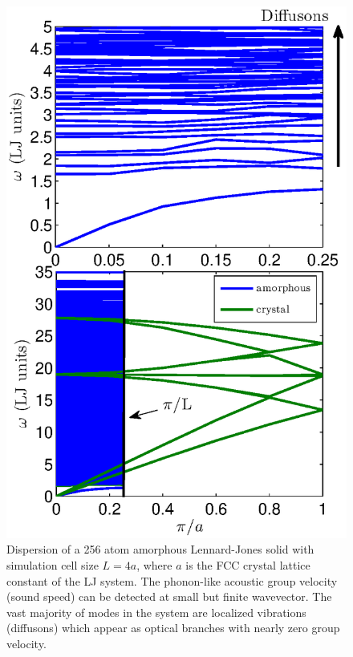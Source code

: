 \documentclass[letterpaper,12pt]{article}
\begin{document}
\begin{figure}
\begin{center}
\includegraphics[scale=0.6]{amor_disp.eps}
\vspace*{-5mm}
\end{center}
\caption{\label{FIG:amor_phonon_disp} Dispersion of a 256 atom amorphous Lennard-Jones solid with simulation cell size $L=4a$, where $a$ is the FCC crystal lattice constant of the LJ system. The phonon-like acoustic group velocity (sound speed) can be detected at small but finite wavevector. The vast majority of modes in the system are localized vibrations (diffusons) which appear as optical branches with nearly zero group velocity.}
\end{figure}
\end{document}
